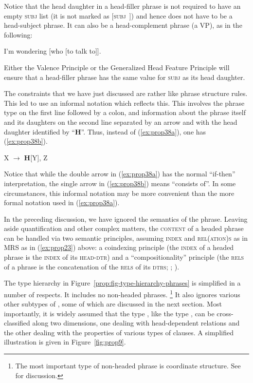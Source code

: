 \documentclass[output=paper
	        ,collection
	        ,collectionchapter
 	        ,biblatex
                ,babelshorthands
                ,newtxmath
                ,draftmode
                ,colorlinks, citecolor=brown
]{langscibook}
\begin{document}
Notice that the head daughter in a head-filler phrase is not required to have an empty \textsc{subj} list (it is not marked as [\textsc{subj}~\eliste]) and hence does not have to be a head-subject phrase. It can also be a head-complement phrase (a VP), as in the following:

\ea\label{ex:prop37}
I’m wondering [who [to talk to]].
\z

\noindent
Either the Valence Principle or the Generalized Head Feature Principle will ensure that a head-filler phrase has the same value for \textsc{subj} as its head daughter.

The constraints that we have just discussed are rather like phrase structure rules. This led \citet[33]{GSag2000a-u} to use an informal notation which reflects this. This involves the phrase type on the first line followed by a colon, and information about the phrase itself and its daughters on the second line separated by an arrow and with the head daughter identified by ``\textbf{H}''. Thus, instead of (\ref{ex:prop38a}), one has (\ref{ex:prop38b}).

\eal\label{ex:prop38}
\ex\label{ex:prop38a}
 \impl
{}
\ex\label{ex:prop38b}
	
X $\to$ \textbf{H}[Y], Z
\zl

\noindent
Notice that while the double arrow in (\ref{ex:prop38a}) has the normal ``if-then'' interpretation, the single arrow in (\ref{ex:prop38b}) means ``consists of''. In some circumstances, this informal notation may be more convenient than the more formal notation used in (\ref{ex:prop38a}).

In the preceding discussion, we have ignored the semantics of the phrase. Leaving aside quantification and other complex matters, the \textsc{content} of a headed phrase can be handled via two semantic principles, assuming \textsc{index} and \textsc{rel(ation)s} as in MRS as in (\ref{ex:prop23}) above: a coindexing principle (the \textsc{index} of a headed phrase is the \textsc{index} of its \textsc{head-dtr}) and a ``compositionality'' principle (the \textsc{rels} of a phrase is the concatenation of the \textsc{rels} of its \textsc{dtrs}; \citealp[Section~4.3.2, Section~5]{CFPS2005a}; ).

The type hierarchy in Figure~\ref{prop:fig-type-hierarchy-phrases} is simplified in a number of respects. It includes no non-headed phrases.%
%
\footnote{The most important type of non-headed phrase is coordinate structure. See  for discussion.}
%
It also ignores various other subtypes of , some of which are discussed in the next section. Most importantly, it is widely assumed that the type , like the type , can be cross-classified along two dimensions, one dealing with head-dependent relations and the other dealing with the properties of various types of clauses. A simplified illustration is given in Figure~\ref{fig:prop9}.
\end{document}
